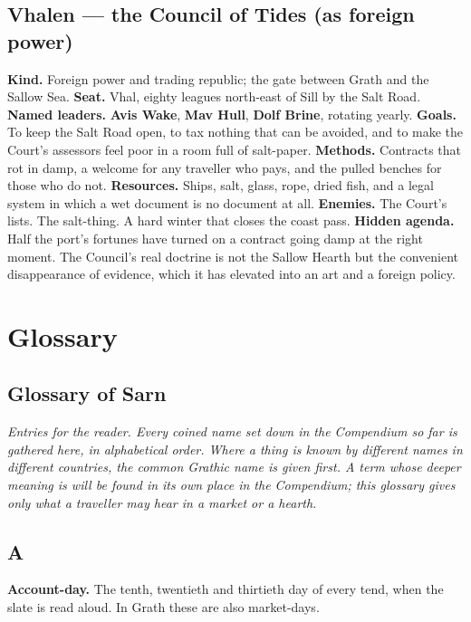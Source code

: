\documentclass{design/chronicle}
\begin{document}
\section*{Vhalen — the Council of Tides (as foreign power)}

\textbf{Kind.} Foreign power and trading republic; the gate between Grath and the Sallow Sea. \textbf{Seat.} Vhal, eighty leagues north-east of Sill by the Salt Road. \textbf{Named leaders.} \textbf{Avis Wake}, \textbf{Mav Hull}, \textbf{Dolf Brine}, rotating yearly. \textbf{Goals.} To keep the Salt Road open, to tax nothing that can be avoided, and to make the Court’s assessors feel poor in a room full of salt-paper. \textbf{Methods.} Contracts that rot in damp, a welcome for any traveller who pays, and the pulled benches for those who do not. \textbf{Resources.} Ships, salt, glass, rope, dried fish, and a legal system in which a wet document is no document at all. \textbf{Enemies.} The Court’s lists. The salt-thing. A hard winter that closes the coast pass. \textbf{Hidden agenda.} Half the port’s fortunes have turned on a contract going damp at the right moment. The Council’s real doctrine is not the Sallow Hearth but the convenient disappearance of evidence, which it has elevated into an art and a foreign policy.

\chapter*{Glossary}
\section*{Glossary of Sarn}

\emph{Entries for the reader. Every coined name set down in the Compendium so far is gathered here, in alphabetical order. Where a thing is known by different names in different countries, the common Grathic name is given first. A term whose deeper meaning is will be found in its own place in the Compendium; this glossary gives only what a traveller may hear in a market or a hearth.}

\CRrule

\section*{A}

\textbf{Account-day.} The tenth, twentieth and thirtieth day of every tend, when the slate is read aloud. In Grath these are also market-days.
\end{document}
